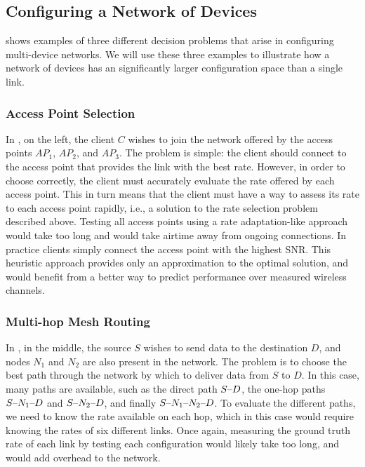 \subsection{Configuring a Network of Devices}
\label{sec:intro_network_problems}
 shows examples of three different decision problems that arise in configuring multi-device networks. We will use these three examples to illustrate how a network of devices has an significantly larger configuration space than a single link.

\subsubsection{Access Point Selection}
In , on the left, the client $C$ wishes to join the network offered by the access points $AP_1$, $AP_2$, and $AP_3$. The  problem is simple: the client should connect to the access point that provides the link with the best rate. However, in order to choose correctly, the client must accurately evaluate the rate offered by each access point. This in turn means that the client must have a way to assess its rate to each access point rapidly, i.e., a solution to the rate selection problem described above. Testing all access points using a rate adaptation-like approach would take too long and would take airtime away from ongoing connections. In practice clients simply connect the access point with the highest SNR\@. This heuristic approach provides only an approximation to the optimal solution, and would benefit from a better way to predict performance over measured wireless channels.

\subsubsection{Multi-hop Mesh Routing}
In , in the middle, the source $S$ wishes to send data to the destination $D$, and nodes $N_1$ and $N_2$ are also present in the network. The  problem is to choose the best path through the network by which to deliver data from $S$ to $D$. In this case, many paths are available, such as the direct path $S\textnormal{--} D$, the one-hop paths $S\textnormal{--} N_1\textnormal{--} D$ and $S\textnormal{--} N_2\textnormal{--} D$, and finally $S\textnormal{--} N_1\textnormal{--} N_2\textnormal{--} D$. To evaluate the different paths, we need to know the rate available on each hop, which in this case would require knowing the rates of six different links. Once again, measuring the ground truth rate of each link by testing each configuration would likely take too long, and would add overhead to the network.

